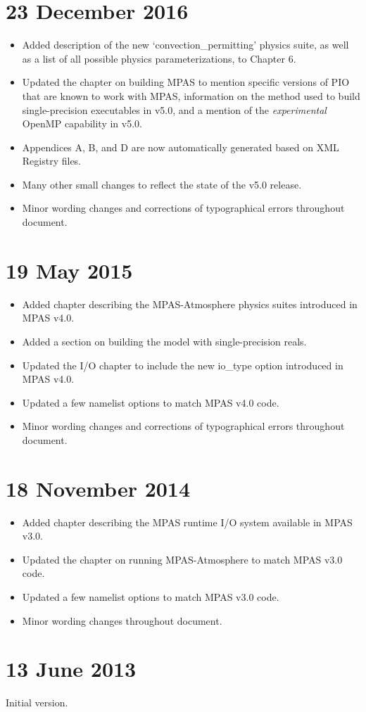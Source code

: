 \section*{23 December 2016}

\begin{itemize}
\item Added description of the new `convection\_permitting' physics suite, as well as
a list of all possible physics parameterizations, to Chapter 6.
\item Updated the chapter on building MPAS to mention specific versions of PIO that are known
to work with MPAS, information on the method used to build single-precision executables in v5.0,
and a mention of the {\em experimental} OpenMP capability in v5.0.
\item Appendices A, B, and D are now automatically generated based on XML Registry files.
\item Many other small changes to reflect the state of the v5.0 release.
\item Minor wording changes and corrections of typographical errors throughout document.
\end{itemize}

\section*{19 May 2015}

\begin{itemize}
\item Added chapter describing the MPAS-Atmosphere physics suites introduced in MPAS v4.0.
\item Added a section on building the model with single-precision reals.
\item Updated the I/O chapter to include the new io\_type option introduced in MPAS v4.0.
\item Updated a few namelist options to match MPAS v4.0 code.
\item Minor wording changes and corrections of typographical errors throughout document.
\end{itemize}

\section*{18 November 2014}

\begin{itemize}
\item Added chapter describing the MPAS runtime I/O system available in MPAS v3.0.
\item Updated the chapter on running MPAS-Atmosphere to match MPAS v3.0 code.
\item Updated a few namelist options to match MPAS v3.0 code.
\item Minor wording changes throughout document.
\end{itemize}

\section*{13 June 2013}

Initial version.
